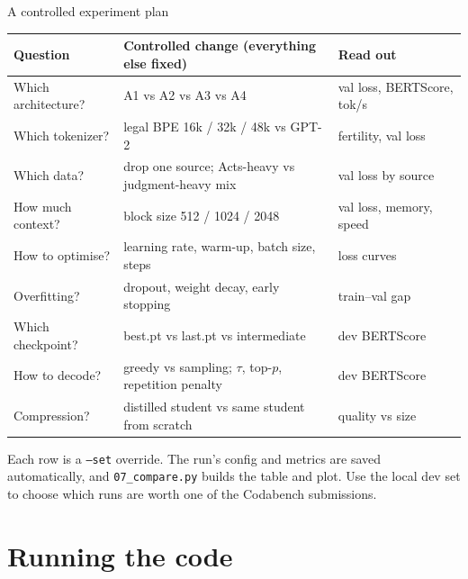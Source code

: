 \documentclass[aspectratio=169,11pt]{beamer}
\newcommand{\code}[1]{\texttt{\small #1}}
\begin{document}
\begin{frame}{A controlled experiment plan}
  \small
  \begin{tabularx}{\textwidth}{@{}lXl@{}}
    \toprule
    Question & Controlled change (everything else fixed) & Read out\\
    \midrule
    Which architecture? & A1 vs A2 vs A3 vs A4 & val loss, BERTScore, tok/s\\
    Which tokenizer? & legal BPE 16k / 32k / 48k vs GPT-2 & fertility, val loss\\
    Which data? & drop one source; Acts-heavy vs judgment-heavy mix & val loss by source\\
    How much context? & block size 512 / 1024 / 2048 & val loss, memory, speed\\
    How to optimise? & learning rate, warm-up, batch size, steps & loss curves\\
    Overfitting? & dropout, weight decay, early stopping & train--val gap\\
    Which checkpoint? & best.pt vs last.pt vs intermediate & dev BERTScore\\
    How to decode? & greedy vs sampling; $\tau$, top-$p$, repetition penalty & dev BERTScore\\
    Compression? & distilled student vs same student from scratch & quality vs size\\
    \bottomrule
  \end{tabularx}
  \vspace{2mm}

  Each row is a \code{--set} override. The run's config and metrics are saved automatically, and \code{07\_compare.py} builds the table and plot.
  Use the local dev set to choose which runs are worth one of the Codabench submissions.
\end{frame}

\section{Running the code}
\end{document}
